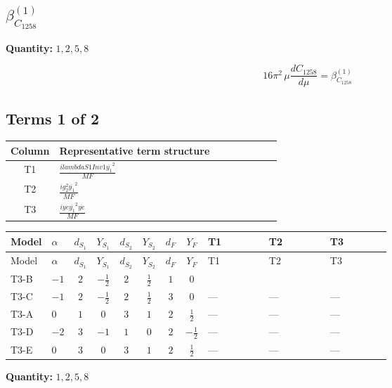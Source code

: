 \documentclass[8pt]{article}
\begin{document}
\begin{landscape}
\section*{$\beta_{C_{1258}}^{(1)}$}
\noindent\textbf{Quantity: }$\mathrm{1,2,5,8}$\par\smallskip
\[16\pi^2\,\mu\frac{d C_{1258}}{d\mu}=\beta_{C_{1258}}^{(1)}\]
\subsection*{Terms 1 of 2}
\begin{center}
\begin{tabular}{@{}c >{\raggedright\arraybackslash}p{0.82\linewidth}@{}}
\toprule
Column & Representative term structure \\
\midrule
T1 & \(\displaystyle \frac{i lambdaS1Inv1 \overline{y_{1}}^{2}}{MF}\) \\
\midrule
T2 & \(\displaystyle \frac{i g_{2}^{2} \overline{y_{1}}^{2}}{MF}\) \\
\midrule
T3 & \(\displaystyle \frac{i ye \overline{y_{1}}^{2} \overline{ye}}{MF}\) \\
\midrule
\bottomrule
\end{tabular}
\end{center}
\smallskip
\tiny
\begin{longtable}{@{}llcccccc >{\raggedright\arraybackslash}p{0.21\linewidth} >{\raggedright\arraybackslash}p{0.21\linewidth} >{\raggedright\arraybackslash}p{0.21\linewidth}@{}}
\toprule
Model & $\alpha$ & $d_{S_1}$ & $Y_{S_1}$ & $d_{S_2}$ & $Y_{S_2}$ & $d_F$ & $Y_F$ & T1 & T2 & T3 \\
\midrule
\endfirsthead
\toprule
Model & $\alpha$ & $d_{S_1}$ & $Y_{S_1}$ & $d_{S_2}$ & $Y_{S_2}$ & $d_F$ & $Y_F$ & T1 & T2 & T3 \\
\midrule
\endhead
T3-B & $-1$ & $2$ & $-\frac{1}{2}$ & $2$ & $\frac{1}{2}$ & $1$ & $0$ & \scriptsize\adjustbox{max width=\linewidth}{$\begin{gathered} \frac{i lambdaS1Inv1 \overline{y_{1}}^{2}}{4 MF}\end{gathered}$} & \scriptsize\adjustbox{max width=\linewidth}{$\begin{gathered} \frac{3 i g_{2}^{2} \overline{y_{1}}^{2}}{8 MF}\end{gathered}$} & \scriptsize\adjustbox{max width=\linewidth}{$\begin{gathered} - \frac{i ye \overline{y_{1}}^{2} \overline{ye}}{8 MF}\end{gathered}$} \\
\midrule
T3-C & $-1$ & $2$ & $-\frac{1}{2}$ & $2$ & $\frac{1}{2}$ & $3$ & $0$ & --- & --- & --- \\
\midrule
T3-A & $0$ & $1$ & $0$ & $3$ & $1$ & $2$ & $\frac{1}{2}$ & --- & --- & --- \\
\midrule
T3-D & $-2$ & $3$ & $-1$ & $1$ & $0$ & $2$ & $-\frac{1}{2}$ & --- & --- & --- \\
\midrule
T3-E & $0$ & $3$ & $0$ & $3$ & $1$ & $2$ & $\frac{1}{2}$ & --- & --- & --- \\
\midrule
\bottomrule
\end{longtable}
\clearpage
\noindent\textbf{Quantity: }$\mathrm{1,2,5,8}$\par\smallskip

\end{landscape}
\end{document}

